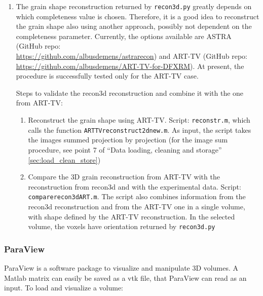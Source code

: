\documentclass[11pt]{scrartcl}
\begin{document}
\begin{enumerate}    
    \item The grain shape reconstruction returned by {\texttt{recon3d.py}} greatly depends on which completeness value is chosen. Therefore, it is a good idea to reconstruct the grain shape also using another approach, possibly not dependent on the completeness parameter. Currently, the options available are {\footnotesize{ASTRA}} (GitHub repo: \\ \href{https://github.com/albusdemens/astrarecon}{https://github.com/albusdemens/astrarecon}) and {\footnotesize{ART-TV}} (GitHub repo: \\ \href{https://github.com/albusdemens/ART-TV-for-DFXRM}{https://github.com/albusdemens/ART-TV-for-DFXRM}). At present, the procedure is successfully tested only for the {\footnotesize{ART-TV}} case.
    
    Steps to validate the recon3d reconstruction and combine it with the one from {\footnotesize{ART-TV}}:
    \begin{enumerate}
        \item Reconstruct the grain shape using {\footnotesize{ART-TV}}. Script: {\texttt{reconstr.m}}, which calls the function {\texttt{ART\textunderscore TV\textunderscore reconstruct\textunderscore 2d\textunderscore new.m}}. As input, the script takes the images summed projection by projection (for the image sum procedure, see point 7 of ``Data loading, cleaning and storage'' \ref{sec:load_clean_store})
        \item Compare the {\footnotesize{3D}} grain reconstruction from {\footnotesize{ART-TV}} with the reconstruction from recon3d and with the experimental data. Script: {\texttt{compare\textunderscore recon3d\textunderscore ART.m}}. The script also combines information from the recon3d reconstruction and from the {\footnotesize{ART-TV}} one in a single volume, with shape defined by the {\footnotesize{ART-TV}} reconstruction. In the selected volume, the voxels have orientation returned by {\texttt{recon3d.py}}
    \end{enumerate}
\end{enumerate}

\subsubsection{ParaView}

ParaView is a software package to visualize and manipulate {\footnotesize{3D}} volumes. A Matlab matrix can easily be saved as a vtk file, that ParaView can read as an input. To load and visualize a volume:
\end{document}

